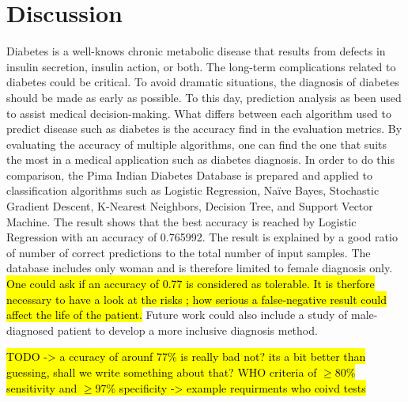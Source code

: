 \documentclass[11pt]{article}
\begin{document}
	\section{Discussion}
	Diabetes is a well-knows chronic metabolic disease that results from defects in insulin secretion, insulin action, or both. The long-term complications related to diabetes could be critical. To avoid dramatic situations, the diagnosis of diabetes should be made as early as possible. To this day, prediction analysis as been used to assist medical decision-making. What differs between each algorithm used to predict disease such as diabetes is the accuracy find in the evaluation metrics. By evaluating the accuracy of multiple algorithms, one can find the one that suits the most in a medical application such as diabetes diagnosis. In order to do this comparison, the Pima Indian Diabetes Database is prepared and applied to classification algorithms such as Logistic Regression, Naïve Bayes, Stochastic Gradient Descent, K-Nearest Neighbors, Decision Tree, and Support Vector Machine. The result shows that the best accuracy is reached by Logistic Regression with an accuracy of 0.765992. The result is explained by a good ratio of number of correct predictions to the total number of input samples. The database includes only woman and is therefore limited to female diagnosis only. 
	\hl{One could ask if an accuracy of 0.77 is considered as tolerable. It is therfore necessary to have a look at the risks ; how serious a false-negative result could affect the life of the patient.} Future work could also include a study of male-diagnosed patient to develop a more inclusive diagnosis method.

	\hl{TODO -> a ccuracy of arounf 77\% is really bad not? its a bit better than guessing, shall we write something about that? WHO criteria of $\geq$80\% sensitivity and $\geq$97\% specificity -> example requirments who coivd tests}
	

\printbibliography
\end{document}
